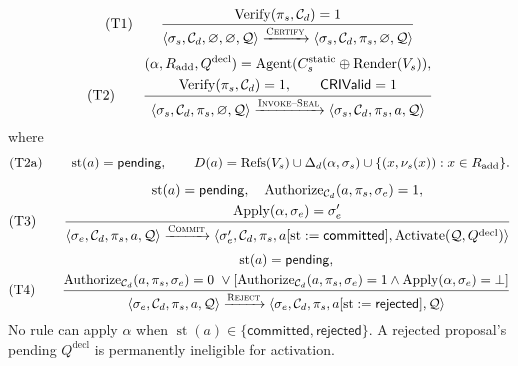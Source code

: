 \begin{equation*}
\textup{(T1)}\qquad
\frac{\operatorname{Verify}(\pi_s,\mathcal C_d)=1}
{\langle\sigma_s,\mathcal C_d,\varnothing,\varnothing,\mathcal Q\rangle
\xrightarrow{\textsc{Certify}}
\langle\sigma_s,\mathcal C_d,\pi_s,\varnothing,\mathcal Q\rangle}
\end{equation*}
\begin{equation*}
\textup{(T2)}\qquad
\frac{\begin{gathered}
(\alpha,R_{\mathrm{add}},Q^{\mathrm{decl}})
=\operatorname{Agent}(C_s^{\mathrm{static}}\oplus\operatorname{Render}(V_s)),\\
\operatorname{Verify}(\pi_s,\mathcal C_d)=1,\qquad \mathsf{CRIValid}=1
\end{gathered}}
{\langle\sigma_s,\mathcal C_d,\pi_s,\varnothing,\mathcal Q\rangle
\xrightarrow{\textsc{Invoke--Seal}}
\langle\sigma_s,\mathcal C_d,\pi_s,a,\mathcal Q\rangle}
\end{equation*}
where
\begin{equation*}
\textup{(T2a)}\qquad
\operatorname{st}(a)=\mathsf{pending},\qquad
D(a)=\operatorname{Refs}(V_s)\cup\Delta_d(\alpha,\sigma_s)
\cup\{(x,\nu_s(x)):x\in R_{\mathrm{add}}\}.
\end{equation*}
\begin{equation*}
\textup{(T3)}\qquad
\frac{\begin{gathered}
\operatorname{st}(a)=\mathsf{pending},\quad
\operatorname{Authorize}_{\mathcal C_d}(a,\pi_s,\sigma_e)=1,\\
\operatorname{Apply}(\alpha,\sigma_e)=\sigma'_e
\end{gathered}}
{\langle\sigma_e,\mathcal C_d,\pi_s,a,\mathcal Q\rangle
\xrightarrow{\textsc{Commit}}
\langle\sigma'_e,\mathcal C_d,\pi_s,
a[\operatorname{st}:=\mathsf{committed}],
\operatorname{Activate}(\mathcal Q,Q^{\mathrm{decl}})\rangle}
\end{equation*}
\begin{equation*}
\textup{(T4)}\qquad
\frac{\begin{gathered}
\operatorname{st}(a)=\mathsf{pending},\\
\operatorname{Authorize}_{\mathcal C_d}(a,\pi_s,\sigma_e)=0
\ \lor
[\operatorname{Authorize}_{\mathcal C_d}(a,\pi_s,\sigma_e)=1
\land\operatorname{Apply}(\alpha,\sigma_e)=\bot]
\end{gathered}}
{\langle\sigma_e,\mathcal C_d,\pi_s,a,\mathcal Q\rangle
\xrightarrow{\textsc{Reject}}
\langle\sigma_e,\mathcal C_d,\pi_s,
a[\operatorname{st}:=\mathsf{rejected}],\mathcal Q\rangle}
\end{equation*}
No rule can apply $\alpha$ when
$\operatorname{st}(a)\in\{\mathsf{committed},\mathsf{rejected}\}$. A rejected proposal's pending $Q^{\mathrm{decl}}$ is permanently ineligible for activation.
